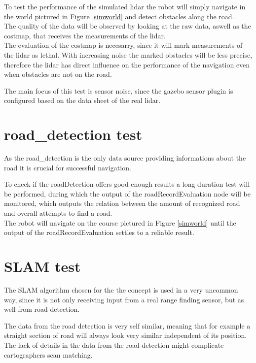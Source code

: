 To test the performance of the simulated lidar the robot will simply navigate in the world pictured in Figure \ref{simworld} and detect obstacles along the road.\\

The quality of the data will be observed by looking at the raw data, aswell as the costmap, that receives the measurements of the lidar.\\

The evaluation of the costmap is necesarry, since it will mark measurements of the lidar as lethal. With increasing noise the marked obstacles will be less precise, therefore the lidar has direct influence on the performance of the navigation even when obstacles are not on the road.

The main focus of this test is sensor noise, since the gazebo sensor plugin is configured based on the data sheet of the real lidar.

\section{road\_detection test}
As the road\_detection is the only data source providing informations about the road it is crucial for successful navigation.

To check if the roadDetection offers good enough results a long duration test will be performed, during which the output of the roadRecordEvaluation node will be monitored, which outputs the relation between the amount of recognized road and overall attempts to find a road.\\

The robot will navigate on the course pictured in Figure \ref{simworld} until the output of the roadRecordEvaluation settles to a reliable result.

\section{SLAM test}
The SLAM algorithm chosen for the the concept is used in a very uncommon way, since it is not only receiving input from a real range finding sensor, but as well from road detection.

The data from the road detection is very self similar, meaning that for example a straight section of road will always look very similar independent of its position. The lack of details in the data from the road detection might complicate cartographers scan matching.



